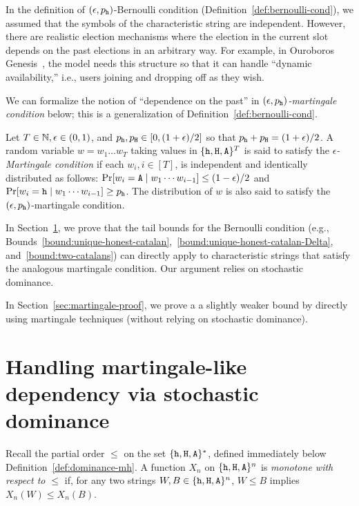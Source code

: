 In the definition of $(\epsilon, p_{\mathtt{h}})$-Bernoulli condition (Definition~\ref{def:bernoulli-cond}), 
we assumed that the symbols of the characteristic string are independent. 
However, there are realistic election mechanisms where 
the election in the current slot depends on the past elections in an arbitrary way. 
For example, in Ouroboros Genesis~\cite{Genesis}, the model needs this structure 
so that it can handle ``dynamic availability,'' i.e., users joining and dropping off as they wish.

We can formalize the notion of ``dependence on the past'' 
in \emph{$(\epsilon, p_{\mathtt{h}})$-martingale condition} below;
this is a generalization of Definition~\ref{def:bernoulli-cond}. 


\begin{definition}\label{def:martingale-cond}
  Let $T \in \mathbb{N}, \epsilon \in (0,1)$, and $p_{\mathtt{h}}, p_{\mathtt{H}} \in  [0, (1+\epsilon)/2]$ so that 
  $p_{\mathtt{h}} + p_{\mathtt{H}} = (1+\epsilon)/2$. A random variable $w = w_1 \ldots w_T$
  taking values in $\{\mathtt{h}, \mathtt{H}, \mathtt{A}\}^T$ is said to satisfy the
  \emph{$\epsilon$-Martingale condition} if each
  $w_i, i \in [T]$, is independent and identically distributed as
  follows: 
  $\Pr[w_i = \mathtt{A} \mid w_1 \cdots w_{i-1}] \leq (1-\epsilon)/2$ and 
  $\Pr[w_i = \mathtt{h} \mid w_1 \cdots w_{i-1}] \geq p_{\mathtt{h}}$.
  The distribution of $w$ is also said
  to satisfy the $(\epsilon, p_{\mathtt{h}})$-martingale condition.
\end{definition}


In Section~\ref{sec:martingale-dominance}, we prove that the tail bounds 
for the Bernoulli condition 
(e.g., Bounds~\ref{bound:unique-honest-catalan},~\ref{bound:unique-honest-catalan-Delta}, 
and~\ref{bound:two-catalans})
can directly apply to characteristic strings that satisfy the analogous martingale condition. 
Our argument relies on stochastic dominance.

In Section~\ref{sec:martingale-proof}, 
we prove a a slightly weaker bound 
by directly using martingale techniques (without relying on stochastic dominance). 



\section{Handling martingale-like dependency via stochastic dominance}\label{sec:martingale-dominance}


  
  Recall the partial order $\leq$ on the set $\{\mathtt{h}, \mathtt{H}, \mathtt{A}\}^*$, 
  defined immediately below Definition~\ref{def:dominance-mh}.
  A function $X_n$ on $\{\mathtt{h}, \mathtt{H}, \mathtt{A}\}^n$ is \emph{monotone with respect to $\leq$} 
  if, for any two strings $W, B \in \{\mathtt{h}, \mathtt{H}, \mathtt{A}\}^n$, $W \leq B$ implies $X_n(W) \leq X_n(B)$. 

